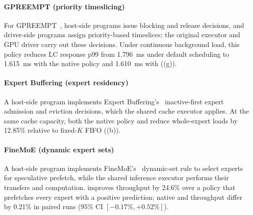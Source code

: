 \paragraph{GPREEMPT (priority timeslicing)}
For GPREEMPT~\cite{fan2025gpreempt}, host-side \sys{} programs issue blocking and release decisions, and driver-side \sys{} programs assign priority-based timeslices; the original executor and GPU driver carry out these decisions.
Under continuous background load, this policy reduces LC response p99 from 1.796~ms under default scheduling to 1.615~ms with the native policy and 1.610~ms with \sys{} ((g)).

\paragraph{Expert Buffering (expert residency)}
A host-side \sys{} program implements Expert Buffering's~\cite{huang2023towards} inactive-first expert admission and eviction decisions, which the shared cache executor applies.
At the same cache capacity, both the native policy and \sys{} reduce whole-expert loads by 12.85\% relative to fixed-$K$ FIFO ((b)).

\paragraph{FineMoE (dynamic expert sets)}
A host-side \sys{} program implements FineMoE's~\cite{yu2026finemoe} dynamic-set rule to select experts for speculative prefetch, while the shared inference executor performs their transfers and computation.
\sys{} improves throughput by 24.6\% over a policy that prefetches every expert with a positive prediction; native and \sys{} throughput differ by 0.21\% in paired runs (95\% CI $[-0.17\%,+0.52\%]$).

